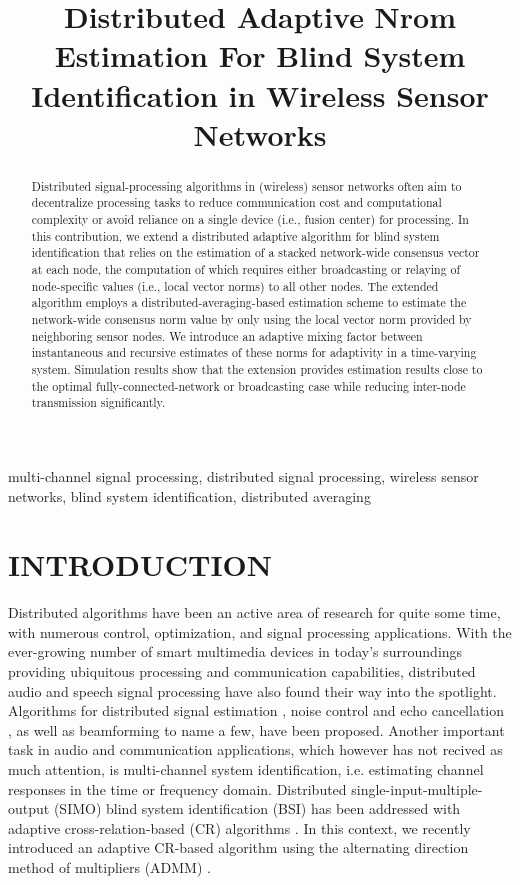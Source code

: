 \documentclass{article}
\title{Distributed Adaptive Nrom Estimation For Blind System\\Identification in Wireless Sensor Networks}
\begin{document}
\ninept
%
\maketitle
%
\begin{abstract}
    Distributed signal-processing algorithms in (wireless) sensor networks often aim to decentralize processing tasks to reduce communication cost and computational complexity or avoid reliance on a single device (i.e., fusion center) for processing.
    In this contribution, we extend a distributed adaptive algorithm for blind system identification that relies on the estimation of a stacked network-wide consensus vector at each node, the computation of which requires either broadcasting or relaying of node-specific values (i.e., local vector norms) to all other nodes.
    The extended algorithm employs a distributed-averaging-based estimation scheme to estimate the network-wide consensus norm value by only using the local vector norm provided by neighboring sensor nodes.
    We introduce an adaptive mixing factor between instantaneous and recursive estimates of these norms for adaptivity in a time-varying system.
    Simulation results show that the extension provides estimation results close to the optimal fully-connected-network or broadcasting case while reducing inter-node transmission significantly.
\end{abstract}
%
\begin{keywords}
multi-channel signal processing, distributed signal processing, wireless sensor networks, blind system identification, distributed averaging
\end{keywords}
%
\section{INTRODUCTION}
\label{sec:intro}

Distributed algorithms have been an active area of research for quite some time, with numerous control, optimization, and signal processing applications.
With the ever-growing number of smart multimedia devices in today's surroundings providing ubiquitous processing and communication capabilities, distributed audio and speech signal processing have also found their way into the spotlight.
Algorithms for distributed signal estimation \cite{5483092}, noise control and echo cancellation \cite{9670697}, as well as beamforming \cite{6663655,6329934,MARKOVICHGOLAN20154,6309434} to name a few, have been proposed.
Another important task in audio and communication applications, which however has not recived as much attention, is multi-channel system identification, i.e. estimating channel responses in the time or frequency domain.
Distributed single-input-multiple-output (SIMO) blind system identification (BSI) has been addressed with adaptive cross-relation-based (CR) algorithms \cite{yuDistributedBlindSystem2014, liuDistributedBlindIdentification2016}.
In this context, we recently introduced an adaptive CR-based algorithm \cite{blochbergerDBSI} using the alternating direction method of multipliers (ADMM) \cite{boydDistributedOptimizationStatistical2011}.
\end{document}
